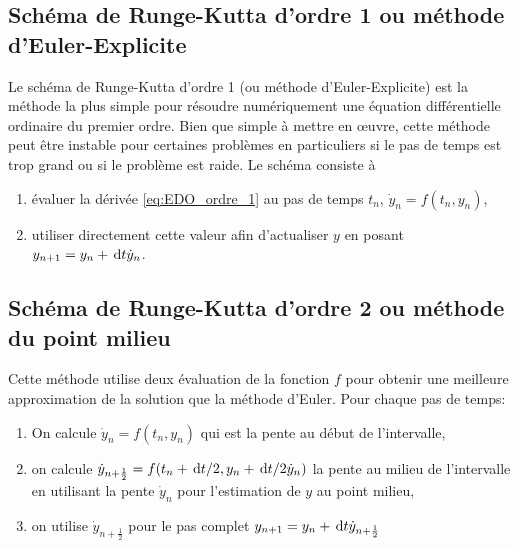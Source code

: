 \documentclass[10pt]{book}
\begin{document}
\begin{appendices}
\subsection{Schéma de Runge-Kutta d'ordre 1 ou méthode d'Euler-Explicite}
Le schéma de Runge-Kutta d'ordre 1 (ou méthode d'Euler-Explicite) est la méthode la plus simple pour résoudre numériquement une équation différentielle ordinaire du premier ordre. Bien que simple à mettre en œuvre, cette méthode peut être instable pour certaines problèmes en particuliers si le pas de temps est trop grand ou si le problème est raide. Le schéma consiste à
\begin{enumerate}
\item évaluer la dérivée \eqref{eq:EDO_ordre_1} au pas de temps $t_{n}$, $\dot{y}_{n} = f(t_{n},y_{n})$, 
\item utiliser directement cette valeur afin d'actualiser $y$ en posant $y_{n+1} = y_{n}+\,\mathrm{d}t\dot{y}_{n}$.
\end{enumerate}
\subsection{Schéma de Runge-Kutta d'ordre 2 ou méthode du point milieu}
Cette méthode utilise deux évaluation de la fonction $f$ pour obtenir une meilleure approximation de la solution que la méthode d'Euler. Pour chaque pas de temps:
\begin{enumerate}
\item On calcule $\dot{y}_{n} = f(t_{n},y_{n})$ qui est la pente au début de l'intervalle,
\item on calcule $\dot{y}_{n+\frac{1}{2}} = f(t_{n}+\,\mathrm{d}t/2,y_{n}+\,\mathrm{d}t/2\dot{y}_{n})$ la pente au milieu de l'intervalle en utilisant la pente $\dot{y}_{n}$ pour l'estimation de $y$ au point milieu,
\item on utilise $\dot{y}_{n+\frac{1}{2}}$ pour le pas complet $y_{n+1} = y_{n}+\,\mathrm{d}t\dot{y}_{n+\frac{1}{2}}$
\end{enumerate}

\end{appendices}
\end{document}
